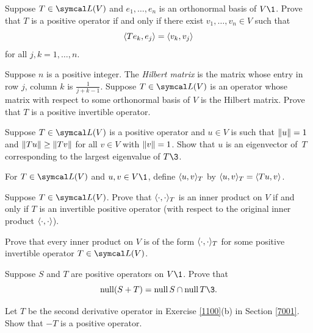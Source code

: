 \begin{exercises}

\exercise
Suppose $T \in \L(V)$ and $e_1, \ldots, e_n$ is an orthonormal basis of $V\1$. Prove that $T$ is a positive operator if and only if there exist
$v_1, \ldots, v_n \in V$ such that
\[
\langle Te_k, e_j\rangle = \langle v_k, v_j\rangle
\]
for all $j, k = 1, \ldots, n$.\label{Grammian}


\exercise
Suppose $n$ is a positive integer. The  \emph{Hilbert matrix} is the  matrix whose entry in row $j$, column $k$ is
$\frac{1}{j+k-1}$. Suppose $T \in \L(V)$ is an operator whose matrix with respect to some orthonormal basis of $V$ is the  Hilbert matrix. Prove that $T$ is a positive invertible operator.
\vspace{-6bp}


\exercise
Suppose $T \in \L(V)$ is a positive operator and $u \in V$ is such that $\lVert u\rVert = 1$ and $\lVert Tu\rVert \ge \lVert Tv\rVert$ for all $v \in V$ with $\lVert v\rVert = 1$. Show that $u$ is an eigenvector of~$T$ corresponding to the largest eigenvalue of $T\3$.


\exercise
For $T \in \L(V)$ and $u, v \in V\1$, define $\langle u, v\rangle_T$ by
$
\langle u, v\rangle_T = \langle Tu, v\rangle$.
\begin{subtheorem}
\item
Suppose $T \in \L(V)$. Prove that $\langle\cdot, \cdot\rangle_T$ is an inner product on $V$ if and only if $T$ is an invertible positive operator (with respect to the original inner product $\langle\cdot, \cdot\rangle$).
\item
Prove that every inner product on $V$ is of the form $\langle\cdot, \cdot\rangle_T$ for some positive invertible operator $T \in \L(V)$.
\end{subtheorem}
\exercisesubtheoremend


\exercise
Suppose $S$ and $T$ are positive operators on $V\1$. Prove that
\[
\ker(S+T) = \ker S \cap \ker T\3.
\]
\exercisedisplayend


\exercise
Let $T$ be the second derivative operator in Exercise \ref{1100}(b) in Section \ref{7001}. Show that $-T$ is a positive operator.


\end{exercises}

